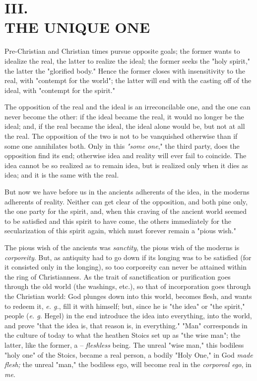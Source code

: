 
\chapter[III. The Unique One]{\centering III.\\
THE UNIQUE ONE}

Pre-Christian and Christian times pursue opposite goals; the former wants to 
idealize the real, the latter to realize the ideal; the former seeks the 
"{}holy spirit,"{} the latter the "{}glorified body."{} Hence the former 
closes with insensitivity to the real, with "{}contempt for the world"{}; the 
latter will end with the casting off of the ideal, with "{}contempt for the 
spirit."{}

The opposition of the real and the ideal is an irreconcilable one, and the one 
can never become the other: if the ideal became the real, it would no longer 
be the ideal; and, if the real became the ideal, the ideal alone would be, but 
not at all the real. The opposition of the two is not to be vanquished 
otherwise than if some one annihilates both. Only in this \textit{"{}some 
one},"{} the third party, does the opposition find its end; otherwise idea and 
reality will ever fail to coincide. The idea cannot be so realized as to 
remain idea, but is realized only when it dies as idea; and it is the same 
with the real.

But now we have before us in the ancients adherents of the idea, in the 
moderns adherents of reality. Neither can get clear of the opposition, and 
both pine only, the one party for the spirit, and, when this craving of the 
ancient world seemed to be satisfied and this spirit to have come, the others 
immediately for the secularization of this spirit again, which must forever 
remain a "{}pious wish."{}

The pious wish of the ancients was \textit{sanctity}, the pious wish of the 
moderns is \textit{corporeity}. But, as antiquity had to go down if its 
longing was to be satisfied (for it consisted only in the longing), so too 
corporeity can never be attained within the ring of Christianness. As the 
trait of sanctification or purification goes through the old world (the 
washings, etc.), so that of incorporation goes through the Christian world: 
God plunges down into this world, becomes flesh, and wants to redeem it, 
\textit{e. g.}, fill it with himself; but, since he is "{}the idea"{} or 
"{}the spirit,"{} people (\textit{e. g.} Hegel) in the end introduce the idea 
into everything, into the world, and prove "{}that the idea is, that reason 
is, in everything."{} "{}Man"{} corresponds in the culture of today to what 
the heathen Stoics set up as "{}the wise man"{}; the latter, like the former, 
a -- \textit{fleshless} being. The unreal "{}wise man,"{} this bodiless 
"{}holy one"{} of the Stoics, became a real person, a bodily "{}Holy One,"{} 
in God \textit{made flesh;} the unreal "{}man,"{} the bodiless ego, will 
become real in the \textit{corporeal ego}, in \textit{me}.

